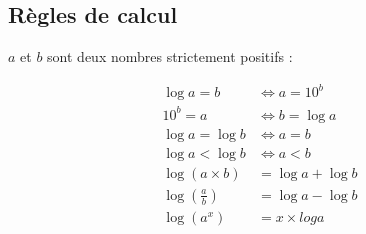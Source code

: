 \documentclass[12pt,a4paper]{article}
\begin{document}
\subsection{Règles de calcul}

\begin{myprops}
	$a$ et $b$ sont deux nombres strictement positifs :
	
	\begin{align*}
		\log a = b &\Leftrightarrow a = 10^b \\
		10^b = a &\Leftrightarrow b = \log a \\
		\log a = \log b &\Leftrightarrow a = b \\
		\log a < \log b &\Leftrightarrow a < b \\
		\log (a \times b) &= \log a + \log b \\
		\log  \left( \frac{a}{b} \right) &= \log a - \log b \\
		\log(a^x) &= x \times log a 
	\end{align*}
\end{myprops}
\end{document}
